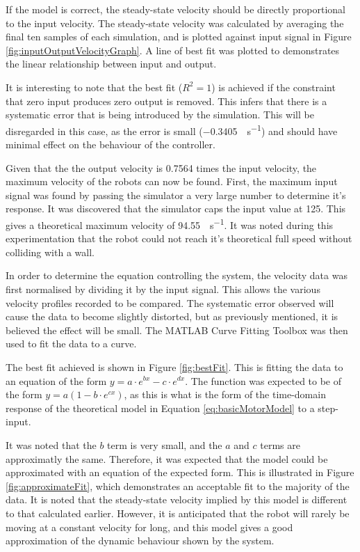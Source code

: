 \documentclass[10pt]{article}
\begin{document}
If the model is correct, the steady-state velocity should be directly
proportional to the input velocity.  The steady-state velocity was calculated by
averaging the final ten samples of each simulation, and is plotted against input
signal in Figure \ref{fig:inputOutputVelocityGraph}.  A line of best fit was
plotted to demonstrates the linear relationship between input and output.

It is interesting to note that the best fit ($R^2 = 1$) is achieved if the
constraint that zero input produces zero output is removed.  This infers that
there is a systematic error that is being introduced by the simulation.  This
will be disregarded in this case, as the error is small
(\SI{-0.3405}{\inch\per\second}) and should have minimal effect on the behaviour
of the controller.

Given that the the output velocity is 0.7564 times the input velocity, the
maximum velocity of the robots can now be found. First, the maximum input signal
was found by passing the simulator a very large number to determine it's
response. It was discovered that the simulator caps the input value at 125.
This gives a theoretical maximum velocity of \SI{94.55}{\inch\per\second}.   It
was noted during this experimentation that the robot could not reach it's
theoretical full speed without colliding with a wall.

In order to determine the equation controlling the system, the velocity data was
first normalised by dividing it by the input signal.  This allows the various
velocity profiles recorded to be compared.  The systematic error observed will
cause the data to become slightly distorted, but as previously mentioned, it is
believed the effect will be small.  The MATLAB Curve Fitting Toolbox was then
used to fit the data to a curve.

The best fit achieved is shown in Figure \ref{fig:bestFit}.  This is fitting the
data to an equation of the form $y = a \cdot e^{bx} - c \cdot e^{dx} $.  The
function was expected to be of the form $y = a(1-b \cdot e^{cx})$, as this is
what is the form of the time-domain response of the theoretical model in
Equation \ref{eq:basicMotorModel} to a step-input.

It was noted that the $b$ term is very small, and the $a$ and $c$ terms are
approximatly the same.  Therefore, it was expected that the model could be
approximated with an equation of the expected form.  This is illustrated in
Figure \ref{fig:approximateFit}, which demonstrates an acceptable fit to the
majority of the data.  It is noted that the steady-state velocity implied by
this model is different to that calculated earlier.  However, it is anticipated
that the robot will rarely be moving at a constant velocity for long, and this
model gives a good approximation of the dynamic behaviour shown by the system.
\end{document}
